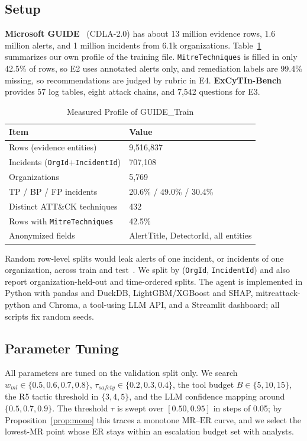 \documentclass[conference]{IEEEtran}
\begin{document}
\subsection{Setup}
\textbf{Microsoft GUIDE}~\cite{freitas2024cgr} (CDLA-2.0) has about 13
million evidence rows, 1.6 million alerts, and 1 million incidents from
6.1k organizations. Table~\ref{tab:guide} summarizes our own profile of
the training file. \texttt{MitreTechniques} is filled in only 42.5\% of
rows, so E2 uses annotated alerts only, and remediation labels are
99.4\% missing, so recommendations are judged by rubric in E4.
\textbf{ExCyTIn-Bench}~\cite{wu2025excytin} provides 57 log tables,
eight attack chains, and 7{,}542 questions for E3.

\begin{table}[t]
\caption{Measured Profile of GUIDE\_Train}
\label{tab:guide}
\centering
\footnotesize
\begin{tabular}{@{}ll@{}}
\toprule
\textbf{Item} & \textbf{Value} \\
\midrule
Rows (evidence entities) & 9{,}516{,}837 \\
Incidents (\texttt{OrgId}+\texttt{IncidentId}) & 707{,}108 \\
Organizations & 5{,}769 \\
TP / BP / FP incidents & 20.6\% / 49.0\% / 30.4\% \\
Distinct ATT\&CK techniques & 432 \\
Rows with \texttt{MitreTechniques} & 42.5\% \\
Anonymized fields & AlertTitle, DetectorId, all entities \\
\bottomrule
\end{tabular}
\end{table}

Random row-level splits would leak alerts of one incident, or incidents
of one organization, across train and test~\cite{arp2022}. We split by
(\texttt{OrgId}, \texttt{IncidentId}) and also report
organization-held-out and time-ordered splits. The agent is implemented
in Python with pandas and DuckDB, LightGBM/XGBoost and SHAP,
mitreattack-python and Chroma, a tool-using LLM API, and a Streamlit
dashboard; all scripts fix random seeds.

\subsection{Parameter Tuning}
All parameters are tuned on the validation split only. We search
$w_{ml}\in\{0.5,0.6,0.7,0.8\}$, $\tau_{safety}\in\{0.2,0.3,0.4\}$, the
tool budget $B\in\{5,10,15\}$, the R5 tactic threshold in $\{3,4,5\}$,
and the LLM confidence mapping around $\{0.5,0.7,0.9\}$. The threshold
$\tau$ is swept over $[0.50,0.95]$ in steps of 0.05; by
Proposition~\ref{prop:mono} this traces a monotone
$\mathrm{MR}$--$\mathrm{ER}$ curve, and we select the lowest-MR point
whose ER stays within an escalation budget set with analysts.
\end{document}
